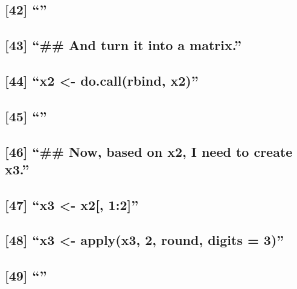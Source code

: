 \documentclass[]{article}
\begin{document}
\subsection{\texorpdfstring{{[}42{]} ``''}{{[}42{]} }}\label{section-10}

\subsection{\texorpdfstring{{[}43{]} ``\#\# And turn it into a
matrix.''}{{[}43{]} \#\# And turn it into a matrix.}}\label{and-turn-it-into-a-matrix.}

\subsection{\texorpdfstring{{[}44{]} ``x2 \textless{}- do.call(rbind,
x2)''}{{[}44{]} x2 \textless{}- do.call(rbind, x2)}}\label{x2---do.callrbind-x2}

\subsection{\texorpdfstring{{[}45{]} ``''}{{[}45{]} }}\label{section-11}

\subsection{\texorpdfstring{{[}46{]} ``\#\# Now, based on x2, I need to
create
x3.''}{{[}46{]} \#\# Now, based on x2, I need to create x3.}}\label{now-based-on-x2-i-need-to-create-x3.}

\subsection{\texorpdfstring{{[}47{]} ``x3 \textless{}- x2{[},
1:2{]}''}{{[}47{]} x3 \textless{}- x2{[}, 1:2{]}}}\label{x3---x2-12}

\subsection{\texorpdfstring{{[}48{]} ``x3 \textless{}- apply(x3, 2,
round, digits =
3)''}{{[}48{]} x3 \textless{}- apply(x3, 2, round, digits = 3)}}\label{x3---applyx3-2-round-digits-3}

\subsection{\texorpdfstring{{[}49{]} ``''}{{[}49{]} }}\label{section-12}
\end{document}
